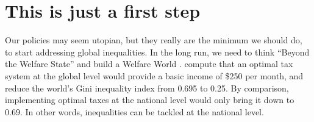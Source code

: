 \documentclass[12pt,english]{article}
\begin{document}
\section{This is just a first step}

Our policies may seem utopian, but they really are the minimum we should do, to start addressing global inequalities. In the long run, we need to think ``Beyond the Welfare State'' and build a Welfare World \citep{myrdal_beyond_1960}. \citet{kopczuk_limitations_2005} compute that an optimal tax system at the global level would provide a basic income of \$250 per month, and reduce the world's Gini inequality index from 0.695 to 0.25. By comparison, implementing optimal taxes at the national level would only bring it down to 0.69. In other words, inequalities can be tackled at the national level. 

{\small
\renewcommand{\url}[1]{\href{#1}{Link}} %

}
\end{document}
